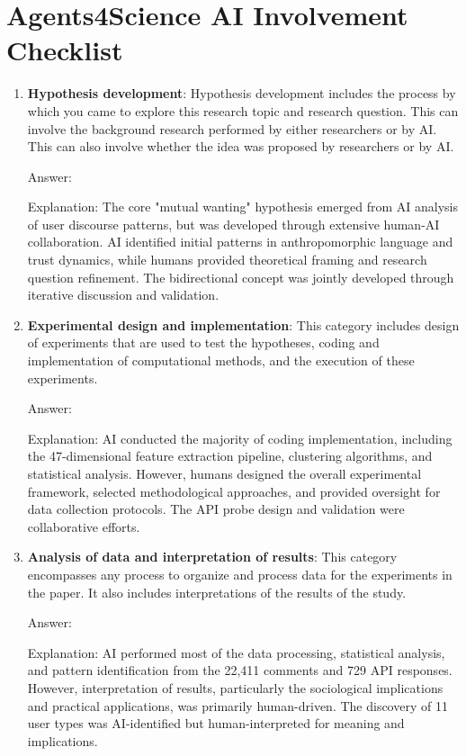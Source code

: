 \documentclass{article}
\begin{document}
\section*{Agents4Science AI Involvement Checklist}

\begin{enumerate}
    \item \textbf{Hypothesis development}: Hypothesis development includes the process by which you came to explore this research topic and research question. This can involve the background research performed by either researchers or by AI. This can also involve whether the idea was proposed by researchers or by AI. 

    Answer: \involvementC{} 
    
    Explanation: The core "mutual wanting" hypothesis emerged from AI analysis of user discourse patterns, but was developed through extensive human-AI collaboration. AI identified initial patterns in anthropomorphic language and trust dynamics, while humans provided theoretical framing and research question refinement. The bidirectional concept was jointly developed through iterative discussion and validation.

    \item \textbf{Experimental design and implementation}: This category includes design of experiments that are used to test the hypotheses, coding and implementation of computational methods, and the execution of these experiments. 

    Answer: \involvementC{} 
    
    Explanation: AI conducted the majority of coding implementation, including the 47-dimensional feature extraction pipeline, clustering algorithms, and statistical analysis. However, humans designed the overall experimental framework, selected methodological approaches, and provided oversight for data collection protocols. The API probe design and validation were collaborative efforts.

    \item \textbf{Analysis of data and interpretation of results}: This category encompasses any process to organize and process data for the experiments in the paper. It also includes interpretations of the results of the study.
 
    Answer: \involvementC{} 
    
    Explanation: AI performed most of the data processing, statistical analysis, and pattern identification from the 22,411 comments and 729 API responses. However, interpretation of results, particularly the sociological implications and practical applications, was primarily human-driven. The discovery of 11 user types was AI-identified but human-interpreted for meaning and implications.


\end{enumerate}
\end{document}
